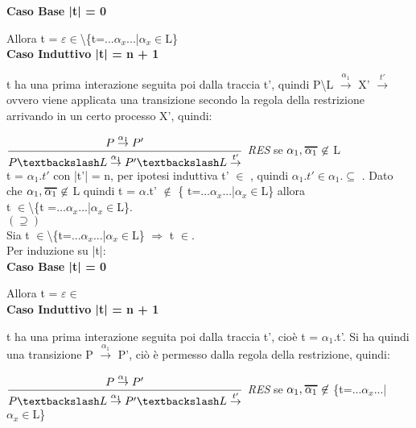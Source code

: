 \textbf{Caso Base |t| = 0}

Allora t = $\varepsilon \in$\textbackslash\{t=...$\alpha_{x}$...|$\alpha_{x}\in$L\}
\\

\textbf{Caso Induttivo |t| = n + 1}

t ha una prima interazione seguita poi dalla traccia t', quindi P\textbackslash L $ \overset{\alpha_{1}}\rightarrow $ X' $\overset{t'}\rightarrow$ ovvero viene applicata una transizione secondo la regola della restrizione arrivando in un certo processo X', quindi:
	
	$\dfrac{P \overset{\alpha_{1}}\rightarrow P'}{P\textbackslash L \overset{\alpha_{1}}\rightarrow P'\textbackslash L\overset{t'}\rightarrow}$ \textit{RES} se $\alpha_{1}, \Overline[1pt]{\alpha_{1}} \not\in$ L\\
	
	t = $\alpha_{1}.t'$ con |t'| = n, per ipotesi induttiva t' $\in$ , quindi 
	$\alpha_{1}.t' \in \alpha_{1}$.$\subseteq$ . Dato che $\alpha_{1}, \Overline[1pt]{\alpha_{1}} \not\in$ L quindi t = $\alpha$.t' $\not \in$ \{ t=...$\alpha_{x}$...|$\alpha_{x}\in$L\}  allora \\
	t $\in$\textbackslash \{t =...$\alpha_{x}$...|$\alpha_{x}\in$L\}.\\

$(\supseteq)$\\

Sia  t $\in$\textbackslash\{t=...$\alpha_{x}$...|$\alpha_{x}\in$L\} $\Rightarrow$ t $\in$.   \\
Per induzione su |t|:
\\

\textbf{Caso Base |t| = 0}

Allora t = $\varepsilon \in$
\\

\textbf{Caso Induttivo |t| = n + 1}

t ha una prima interazione seguita poi dalla traccia t', cioè t = $\alpha_{1}$.t'. Si ha quindi una transizione P $\overset{\alpha_{1}}\rightarrow$ P', ciò è permesso dalla regola della restrizione, quindi:

$\dfrac{P \overset{\alpha_{1}}\rightarrow P'}{P\textbackslash L \overset{\alpha_{1}}\rightarrow P'\textbackslash L\overset{t'}\rightarrow}$ \textit{RES} se $\alpha_{1}, \Overline[1pt]{\alpha_{1}} \not\in$ \{t=...$\alpha_{x}$...|$\alpha_{x}\in$L\}\\

